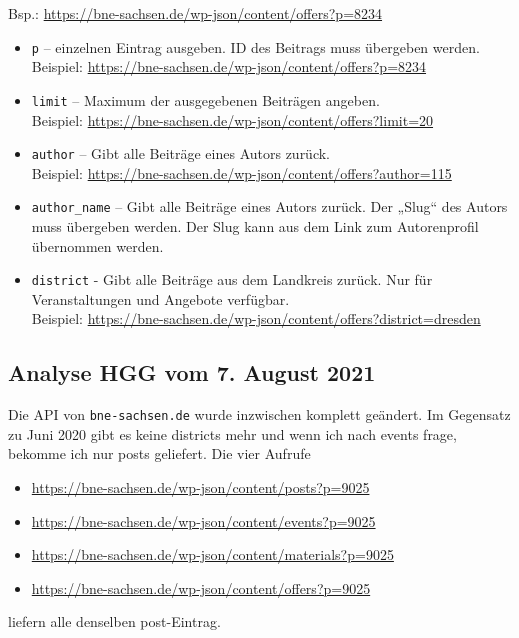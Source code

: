 \documentclass[a4paper,11pt]{article}
\begin{document}
Bsp.: \url{https://bne-sachsen.de/wp-json/content/offers?p=8234} 

\begin{itemize}
  \item \texttt{p} -- einzelnen Eintrag ausgeben. ID des Beitrags muss
    übergeben werden. \\ Beispiel:
    \url{https://bne-sachsen.de/wp-json/content/offers?p=8234} 
  \item \texttt{limit} -- Maximum der ausgegebenen Beiträgen angeben.
    \\ Beispiel: \url{https://bne-sachsen.de/wp-json/content/offers?limit=20}
  \item \texttt{author} -- Gibt alle Beiträge eines Autors zurück.
    \\ Beispiel:
    \url{https://bne-sachsen.de/wp-json/content/offers?author=115}
  \item \texttt{author\_name} -- Gibt alle Beiträge eines Autors zurück. Der
    „Slug“ des Autors muss übergeben werden. Der Slug kann aus dem Link zum
    Autorenprofil übernommen werden.  
  \item \texttt{district} - Gibt alle Beiträge aus dem Landkreis zurück. Nur
    für Veranstaltungen und Angebote verfügbar.  \\ Beispiel:
    \url{https://bne-sachsen.de/wp-json/content/offers?district=dresden}
\end{itemize}

\subsection{Analyse HGG vom 7. August 2021}

Die API von \texttt{bne-sachsen.de} wurde inzwischen komplett geändert.  Im
Gegensatz zu Juni 2020 gibt es keine districts mehr und wenn ich nach events
frage, bekomme ich nur posts geliefert. Die vier Aufrufe
\begin{itemize}
\item \url{https://bne-sachsen.de/wp-json/content/posts?p=9025}
\item \url{https://bne-sachsen.de/wp-json/content/events?p=9025}
\item \url{https://bne-sachsen.de/wp-json/content/materials?p=9025}
\item \url{https://bne-sachsen.de/wp-json/content/offers?p=9025}
\end{itemize}
liefern alle denselben post-Eintrag.
\end{document}
